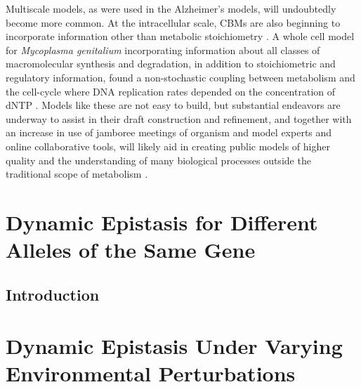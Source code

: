 \documentclass[phd,tocprelim]{cornell}
\newcommand*{\commonDir}{../common/}   %
\begin{document}
Multiscale models, as were used in the Alzheimer’s models, will
undoubtedly become more common. At the intracellular scale, CBMs are
also beginning to incorporate information other than metabolic
stoichiometry \citep{Lerman2012, Karr2012, Yizhak2010}. 
A whole cell model for \textit{Mycoplasma genitalium}
incorporating information about all classes of macromolecular
synthesis and degradation, in addition to stoichiometric and
regulatory information, found a non-stochastic coupling between
metabolism and the cell-cycle where DNA replication rates depended on
the concentration of dNTP \citep{Karr2012}. Models like these are not easy to build,
but substantial endeavors are underway to assist in their draft
construction and refinement, and together with an increase in use of
jamboree meetings of organism and model experts and online
collaborative tools, will likely aid in creating public models of
higher quality and the understanding of many biological processes
outside the traditional scope of metabolism \citep{Aziz2012,
Thiele2013, Herrgard2008, Karr2013, kbase2013, Pabinger2011,
Helikar2012}.


%

\chapter{Dynamic Epistasis for Different Alleles of the Same Gene}

\section{Introduction}
\epiSameGeneAbstract


\chapter{Dynamic Epistasis Under Varying Environmental Perturbations}
\end{document}
